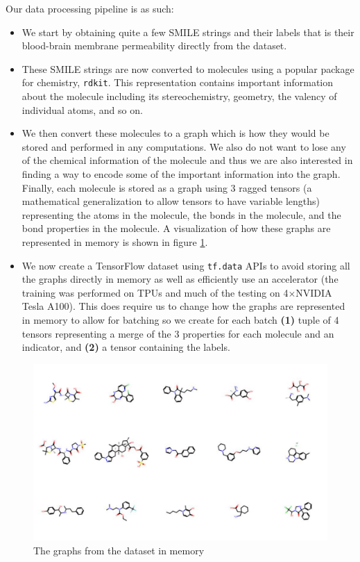 \documentclass[fontsize=11pt]{article}
\begin{document}
Our data processing pipeline is as such:
\begin{itemize}
    \item We start by obtaining quite a few SMILE strings and their labels that is their blood-brain membrane permeability directly from the dataset.
    \item These SMILE strings are now converted to molecules using a popular package for chemistry, \texttt{rdkit}. This representation contains important information about the molecule including its stereochemistry, geometry, the valency of individual atoms, and so on.
    \item We then convert these molecules to a graph which is how they would be stored and performed in any computations. We also do not want to lose any of the chemical information of the molecule and thus we are also interested in finding a way to encode some of the important information into the graph. Finally, each molecule is stored as a graph using 3 ragged tensors (a mathematical generalization to allow tensors to have variable lengths) representing the atoms in the molecule, the bonds in the molecule, and the bond properties in the molecule. A visualization of how these graphs are represented in memory is shown in figure \ref{fig:examples}.
    \item We now create a TensorFlow dataset using \texttt{tf.data} APIs to avoid storing all the graphs directly in memory as well as efficiently use an accelerator (the training was performed on TPUs and much of the testing on 4$\times$NVIDIA Tesla A100). This does require us to change how the graphs are represented in memory to allow for batching so we create for each batch \textbf{(1)} tuple of 4 tensors representing a merge of the 3 properties for each molecule and an indicator, and \textbf{(2)} a tensor containing the labels.
\end{itemize}

\begin{figure}
    \centering
    \includegraphics[width=\textwidth]{example_graphs.pdf}
    \caption{The graphs from the dataset in memory}
    \label{fig:examples}
\end{figure}
\end{document}
